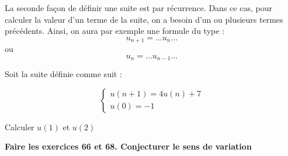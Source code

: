 \documentclass[a4paper,12pt]{article}
\begin{document}
La seconde façon de définir une suite est par récurrence. Dans ce cas, pour calculer la valeur d’un terme de la suite, on a besoin d’un ou plusieurs termes précédents. Ainsi, on aura par exemple une formule du type :
\[
u_{n+1} = \ldots u_n \ldots
\]
ou
\[
u_n = \ldots u_{n-1} \ldots
\]

\begin{tcolorbox}[colback=blue!10!white, colframe=blue!75!black, title=Exercices]

  Soit la suite définie comme suit : 

  \[
    \left\{
      \begin{array}{ll}
            u(n+1) = 4 u(n) + 7 \\
            u(0) = -1 
        \end{array}
      \right.
    \]

  Calculer $u(1)$ et $u(2)$

  {\vspace{6em}}


  \textbf{Faire les exercices 66 et 68. Conjecturer le sens de variation }
\end{tcolorbox}
\end{document}

